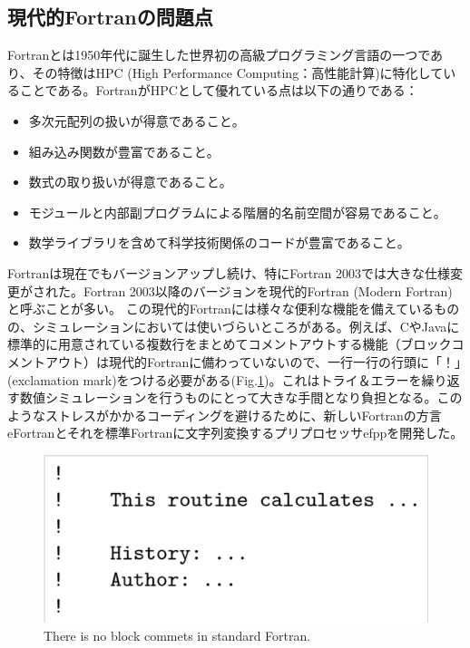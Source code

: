 \documentclass[12pt]{jsarticle}
\begin{document}
\subsection{現代的Fortranの問題点}
Fortranとは1950年代に誕生した世界初の高級プログラミング言語の一つであり、その特徴はHPC (High Performance Computing：高性能計算)に特化していることである。FortranがHPCとして優れている点は以下の通りである：


\begin{itemize}
\item 多次元配列の扱いが得意であること。
\item 組み込み関数が豊富であること。
\item 数式の取り扱いが得意であること。
\item モジュールと内部副プログラムによる階層的名前空間が容易であること。
\item 数学ライブラリを含めて科学技術関係のコードが豊富であること。
\end{itemize}

Fortranは現在でもバージョンアップし続け、特にFortran 2003では大きな仕様変更がされた。Fortran 2003以降のバージョンを現代的Fortran (Modern Fortran)と呼ぶことが多い。
この現代的Fortranには様々な便利な機能を備えているものの、シミュレーションにおいては使いづらいところがある。例えば、CやJavaに標準的に用意されている複数行をまとめてコメントアウトする機能（ブロックコメントアウト）は現代的Fortranに備わっていないので、一行一行の行頭に「！」(exclamation mark)をつける必要がある(Fig.\ref{block-comment1})。これはトライ＆エラーを繰り返す数値シミュレーションを行うものにとって大きな手間となり負担となる。このようなストレスがかかるコーディングを避けるために、新しいFortranの方言eFortranとそれを標準Fortranに文字列変換するプリプロセッサefppを開発した。

\begin{figure}[H]
\centering
\includegraphics[height=0.5\textheight,width=1.0\hsize,angle=0,keepaspectratio]{./Image/block_comment1.png}
\caption{There is no block commets in standard Fortran.} \label{block-comment1}
\end{figure}
\end{document}
